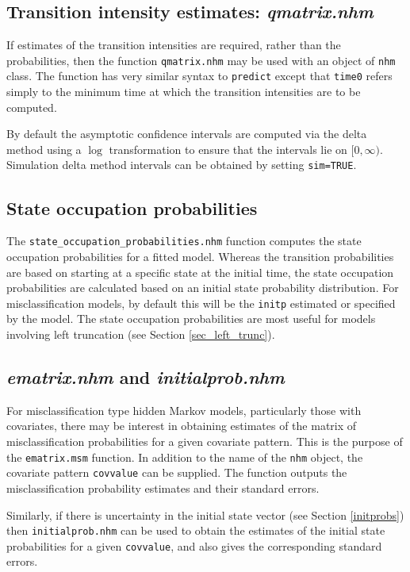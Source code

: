 \documentclass{article}
\numberwithin{equation}{section}
\begin{document}
\subsection{Transition intensity estimates: {\it qmatrix.nhm}}

If estimates of the transition intensities are required, rather than the probabilities, then the function \verb!qmatrix.nhm! may be used with an object of \verb!nhm! class. The function has very similar syntax to \verb!predict! except that \verb!time0! refers simply to the minimum time at which the transition intensities are to be computed. 

By default the asymptotic confidence intervals are computed via the delta method using a $\log$ transformation to ensure that the intervals lie on $[0, \infty)$. Simulation delta method intervals can be obtained by setting \verb!sim=TRUE!. 

\subsection{State occupation probabilities}

The \verb!state_occupation_probabilities.nhm! function computes the state occupation probabilities for a fitted model. Whereas the transition probabilities are based on starting at a specific state at the initial time, the state occupation probabilities are calculated based on an initial state probability distribution. For misclassification models, by default this will be the \verb!initp! estimated or specified by the model. The state occupation probabilities are most useful for models involving left truncation (see Section \ref{sec_left_trunc}). 

\subsection{{\it ematrix.nhm} and {\it initialprob.nhm}}

For misclassification type hidden Markov models, particularly those with covariates, there may be interest in obtaining estimates of the matrix of misclassification probabilities for a given covariate pattern. This is the purpose of the \verb!ematrix.msm! function. In addition to the name of the \verb!nhm! object, the covariate pattern \verb!covvalue! can be supplied. The function outputs the misclassification probability estimates and their standard errors.

Similarly, if there is uncertainty in the initial state vector (see Section \ref{initprobs}) then \verb!initialprob.nhm! can be used to obtain the estimates of the initial state probabilities for a given \verb!covvalue!, and also gives the corresponding standard errors.
\end{document}
